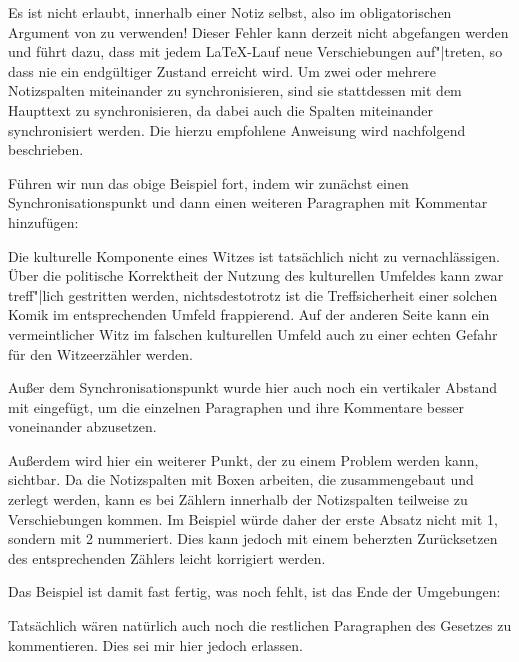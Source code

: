 Es ist nicht erlaubt,  innerhalb
einer Notiz selbst, also im obligatorischen Argument von
 zu verwenden! Dieser Fehler kann derzeit
nicht abgefangen werden und führt dazu, dass mit jedem \LaTeX-Lauf neue
Verschiebungen auf"|treten, so dass nie ein endgültiger Zustand erreicht
wird. Um zwei oder mehrere Notizspalten miteinander zu synchronisieren, sind
sie stattdessen mit dem Haupttext zu synchronisieren, da dabei auch die
Spalten miteinander synchronisiert werden. Die hierzu empfohlene Anweisung
wird nachfolgend beschrieben.%
%
\begin{Example}
  Führen wir nun das obige Beispiel fort, indem wir zunächst einen
  Synchronisationspunkt und dann einen weiteren Paragraphen
  mit Kommentar hinzufügen:
\begin{lstcode}
    \syncwithnotecolumn[paragraphs]\bigskip
    Die kulturelle Komponente eines Witzes ist 
    tatsächlich nicht zu vernachlässigen. Über die
    politische Korrektheit der Nutzung des
    kulturellen Umfeldes kann zwar treff"|lich 
    gestritten werden, nichtsdestotrotz ist die 
    Treffsicherheit einer solchen Komik im
    entsprechenden Umfeld frappierend. Auf der 
    anderen Seite kann ein vermeintlicher Witz im
    falschen kulturellen Umfeld auch zu einer 
    echten Gefahr für den Witzeerzähler werden.
\end{lstcode}
  Außer dem Synchronisationspunkt wurde hier auch noch ein vertikaler
  Abstand mit  eingefügt, um die einzelnen Paragraphen und ihre
  Kommentare besser voneinander abzusetzen.

  Außerdem wird hier ein weiterer Punkt, der zu einem
  Problem werden kann, sichtbar. Da die Notizspalten mit Boxen arbeiten, die
  zusammengebaut und zerlegt werden, kann es bei Zählern innerhalb der Notizspalten teilweise zu Verschiebungen
  kommen. Im Beispiel würde daher der erste Absatz nicht mit 1, sondern mit 2
  nummeriert. Dies kann jedoch mit einem beherzten Zurücksetzen des
  entsprechenden Zählers leicht korrigiert werden.

  Das Beispiel ist damit fast fertig, was noch fehlt, ist das Ende der
  Umgebungen:
\begin{lstcode}
  \end{addmargin}
  
\end{lstcode}
  Tatsächlich wären natürlich auch noch die restlichen Paragraphen des
  Gesetzes zu kommentieren. Dies sei mir hier jedoch erlassen.
\end{Example}%
